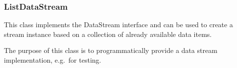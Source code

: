 \subsubsection{ListDataStream}

This class implements the DataStream interface and can be used to create
a stream instance based on a collection of already available data items.

The purpose of this class is to programmatically provide a data stream
implementation, e.g.~for testing.

